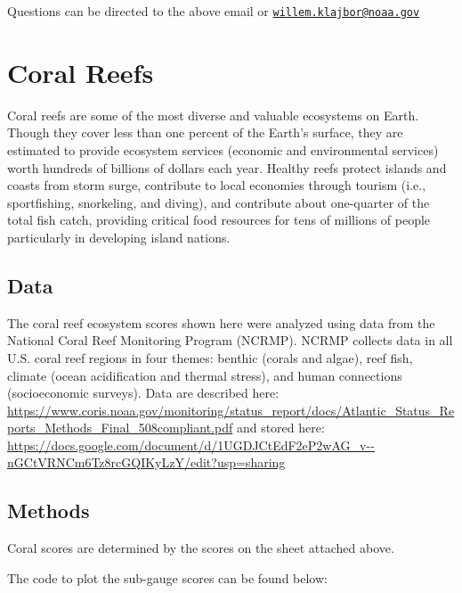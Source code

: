 \documentclass[
]{book}
\begin{document}
Questions can be directed to the above email or \href{mailto:willem.klajbor@noaa.gov}{\nolinkurl{willem.klajbor@noaa.gov}}

\hypertarget{coral-reefs}{%
\chapter{Coral Reefs}\label{coral-reefs}}

Coral reefs are some of the most diverse and valuable ecosystems on Earth. Though they cover less than one percent of the Earth's surface, they are estimated to provide ecosystem services (economic and environmental services) worth hundreds of billions of dollars each year. Healthy reefs protect islands and coasts from storm surge, contribute to local economies through tourism (i.e., sportfishing, snorkeling, and diving), and contribute about one-quarter of the total fish catch, providing critical food resources for tens of millions of people particularly in developing island nations.

\hypertarget{data-1}{%
\section{Data}\label{data-1}}

The coral reef ecosystem scores shown here were analyzed using data from the National Coral Reef Monitoring Program (NCRMP). NCRMP collects data in all U.S. coral reef regions in four themes: benthic (corals and algae), reef fish, climate (ocean acidification and thermal stress), and human connections (socioeconomic surveys). Data are described here: \url{https://www.coris.noaa.gov/monitoring/status_report/docs/Atlantic_Status_Reports_Methods_Final_508compliant.pdf} and stored here: \url{https://docs.google.com/document/d/1UGDJCtEdF2eP2wAG_v--nGCtVRNCm6Tz8rcGQIKyLzY/edit?usp=sharing}

\hypertarget{methods-1}{%
\section{Methods}\label{methods-1}}

Coral scores are determined by the scores on the sheet attached above.

The code to plot the sub-gauge scores can be found below:
\end{document}
